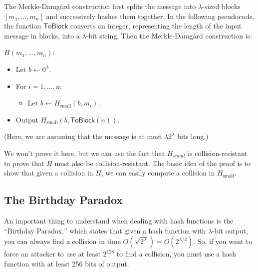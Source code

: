 The Merkle-Damg\aa{}rd construction first splits the
message into $\lambda$-sized blocks $[m_1, \ldots, m_n]$ and successively hashes them together.
In the following pseudocode,
the function $\mathsf{ToBlock}$ converts an integer, representing the length of the input message
in blocks, into a $\lambda$-bit string.
Then the Merkle-Damg\aa{}rd construction is:
\begin{framed}
\noindent
  $H(m_1, \dots, m_n)$: \qquad {}
\begin{itemize}[noitemsep]
  \item Let $b \gets 0^\lambda$.
  \item For $i = 1, \dots, n$:
   \begin{itemize}
     \item Let $b \gets H_\text{small}(b, m_i)$.
   \end{itemize}
 \item Output $H_\text{small}(b, \mathsf{ToBlock}(n))$.
\end{itemize}
\end{framed}
(Here, we are assuming that the message is at most 
$\lambda 2^{\lambda}$ bits long.)

We won't prove it here, but we can use the fact that $H_{small}$ is collision-resistant to prove that $H$ must also be collision-resistant. The basic idea of the proof is to show that given a collision in $H$, we can easily compute a collision in $H_{\text{small}}$. 

\subsection{The Birthday Paradox}
An important thing to understand when dealing with hash functions is the ``Birthday Paradox,'' 
which states that given a hash function with $\lambda$-bit output, you can 
always find a collision in time $O(\sqrt{2^\lambda}) = O(2^{\lambda/2})$.
So, if you want to force an attacker to use at least $2^{128}$ to find a collision,
you must use a hash function with at least 256 bits of output.

